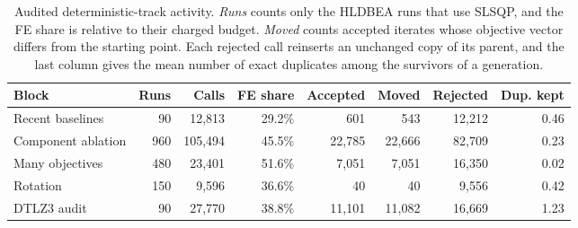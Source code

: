 \begin{table}[!htbp]
\centering
\caption{Audited deterministic-track activity. \emph{Runs} counts only the HLDBEA runs that use SLSQP, and the FE share is relative to their charged budget. \emph{Moved} counts accepted iterates whose objective vector differs from the starting point. Each rejected call reinserts an unchanged copy of its parent, and the last column gives the mean number of exact duplicates among the survivors of a generation.}
\label{tab:solver_audit}
\footnotesize
\setlength{\tabcolsep}{4pt}
\begin{tabular}{|l|r|r|r|r|r|r|r|}
\hline
\textbf{Block} & \textbf{Runs} & \textbf{Calls} & \textbf{FE share} & \textbf{Accepted} & \textbf{Moved} & \textbf{Rejected} & \textbf{Dup. kept} \\ \hline
Recent baselines & 90 & 12{,}813 & 29.2\% & 601 & 543 & 12{,}212 & 0.46 \\
Component ablation & 960 & 105{,}494 & 45.5\% & 22{,}785 & 22{,}666 & 82{,}709 & 0.23 \\
Many objectives & 480 & 23{,}401 & 51.6\% & 7{,}051 & 7{,}051 & 16{,}350 & 0.02 \\
Rotation & 150 & 9{,}596 & 36.6\% & 40 & 40 & 9{,}556 & 0.42 \\
DTLZ3 audit & 90 & 27{,}770 & 38.8\% & 11{,}101 & 11{,}082 & 16{,}669 & 1.23 \\
\hline
\end{tabular}
\end{table}
